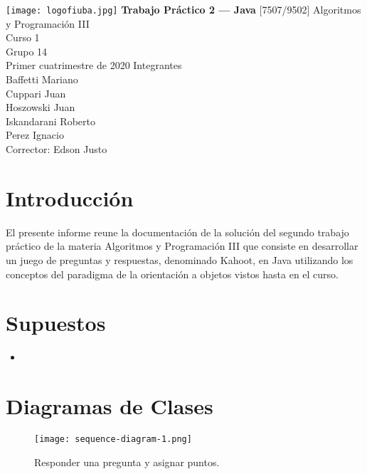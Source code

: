 \documentclass[titlepage,a4paper]{article}
\begin{document}
\begin{titlepage} %
	\hfill\texttt{[image: logofiuba.jpg]}
    \centering
    \vfill
    \Huge \textbf{Trabajo Práctico 2 — Java}
    \vskip2cm
    \Large [7507/9502] Algoritmos y Programación III\\
    Curso 1 \\ %
    Grupo 14 \\
    Primer cuatrimestre de 2020 
    \vfill
    Integrantes\\[1\baselineskip]
    
    Baffetti Mariano\\
    Cuppari Juan\\
    Hoszowski Juan\\
    Iskandarani Roberto\\
    Perez Ignacio\\
    \vfill
    Corrector: Edson Justo
    \vfill
\end{titlepage}

\tableofcontents %
\newpage

\section{Introducción}\label{sec:intro}
El presente informe reune la documentación de la solución del segundo trabajo práctico de la materia Algoritmos y Programación III que consiste en desarrollar un juego de preguntas y respuestas, denominado Kahoot, en Java utilizando los conceptos del paradigma de la orientación a objetos vistos hasta en el curso.


\section{Supuestos}\label{sec:supuestos}
\begin{itemize}
    \item
\end{itemize}


\section{Diagramas de Clases}\label{sec:diagramasdeclases}

\begin{figure}[H]
\centering
\texttt{[image: sequence-diagram-1.png]}
\caption{\label{fig:seq01}Responder una pregunta y asignar puntos.}
\end{figure}
\end{document}
